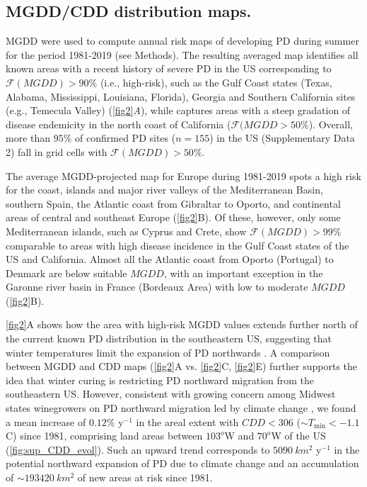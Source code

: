 \subsection{MGDD/CDD distribution maps.}
MGDD were used to compute annual
risk maps of developing PD during summer for the period 1981-2019 (see
Methods). The resulting averaged map identifies all known areas with a
recent
history of severe PD in the US corresponding to $\mathcal{F}(MGDD) > 90\%$
(i.e., high-risk), such as the Gulf Coast states (Texas, Alabama,
Mississippi,
Louisiana, Florida), Georgia and Southern California sites (e.g., Temecula
Valley) (\cref{fig2}\textit{A}), while captures areas with a steep
gradation of
disease endemicity in the north coast of California ($\mathcal{F}(MGDD >
    50\%$). Overall, more than $95\%$ of confirmed PD sites ($n = 155$) in
    the
    US (Supplementary Data 2) fall in grid cells with $\mathcal{F}(MGDD) >
50 \%$.

    The average MGDD-projected map for Europe during 1981-2019 spots a high
    risk
    for the coast, islands and major river valleys of the Mediterranean Basin,
    southern Spain, the Atlantic coast from Gibraltar to Oporto, and
    continental
    areas of central and southeast Europe (\cref{fig2}B). Of these, however,
    only
    some Mediterranean islands, such as Cyprus and Crete, show
$\mathcal{F}(MGDD) >
99\%$ comparable to areas with high disease incidence in the Gulf Coast states
    of the US and California. Almost all the Atlantic coast from Oporto
    (Portugal)
    to Denmark are below suitable $MGDD$, with an important exception in the
    Garonne river basin in France (Bordeaux Area) with low to moderate $MGDD$
    (\cref{fig2}B).

    \cref{fig2}A shows how the area with high-risk MGDD values extends further
    north of the current known PD distribution in the southeastern US,
    suggesting
    that winter temperatures limit the expansion of PD northwards
    \cite{Hopkins2002}. A comparison between MGDD and CDD maps (\cref{fig2}A
    vs.
    \cref{fig2}C, \cref{fig2}E) further supports the idea that winter curing is
    restricting PD northward migration from the southeastern US. However,
    consistent with growing concern among Midwest states winegrowers on PD
    northward migration led by climate change \cite{Galvez2010}, we found a
    mean
    increase of $0.12 \%$ y$^{-1}$ in the areal extent with $CDD < 306$ ($\sim
T_{\textrm{min}} < -1.1$ \textdegree C) since 1981, comprising land areas
    between $103^o$W and $70^o$W of the US (\cref{fig:sup_CDD_evol}). Such an
    upward trend corresponds to $\SI{5090}{km^2}$ y$^{-1}$ in the potential
    northward expansion of PD due to climate change and an accumulation of
$\sim\SI{193420}{km^2}$ of new areas at risk since 1981.

